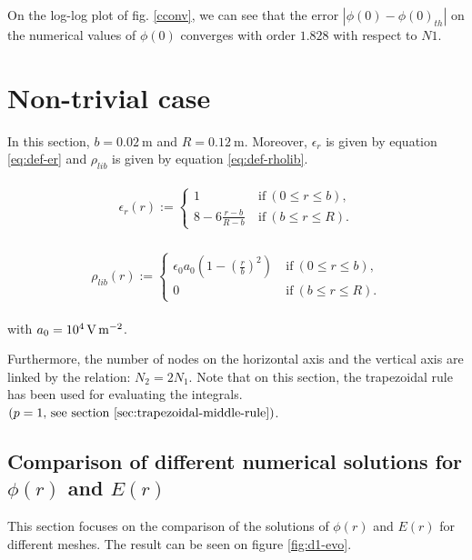 \documentclass[a4paper,12pt,twoside]{article}
\newcommand{\bracket}[1]{\left(#1\right)}
\begin{document}
  On the log-log plot of fig. \ref{cconv}, we can see that the error $|\phi(0)-\phi(0)_{th}|$ on the numerical values of $\phi(0)$ converges with order $1.828$ with respect to $N1$.

  \section{Non-trivial case}
  In this section, $b=\SI{0.02}{\m}$ and $R=\SI{0.12}{\m}$. Moreover, $\epsilon_r$ is given by equation \eqref{eq:def-er} and $\rho_{lib}$ is given by equation \eqref{eq:def-rholib}.

  \begin{align}
    \begin{split}
      \epsilon_r\bracket{r} := \begin{cases}
        1~&\text{if}~\bracket{0\leq r\leq b},\\
        8-6\frac{r-b}{R-b}~&\text{if}~\bracket{b\leq r\leq R}.
      \end{cases}
    \end{split}
    \label{eq:def-er}
  \end{align}

  \begin{align}
    \begin{split}
      \rho_{lib}\bracket{r} := \begin{cases}
        \epsilon_0 a_0\bracket{1-\bracket{\frac{r}{b}}^2}~&\text{if}~\bracket{0\leq r\leq b},\\
        0~&\text{if}~\bracket{b\leq r\leq R}.
      \end{cases}
    \end{split}
    \label{eq:def-rholib}
  \end{align}

  with $a_0=\SI{d4}{\volt\per\square\meter}$.

  Furthermore, the number of nodes on the horizontal axis and the vertical axis are linked by the relation: $N_2 = 2N_1$.
  Note that on this section, the trapezoidal rule has been used for evaluating the integrals. $\bracket{p=1\text{, see section \ref{sec:trapezoidal-middle-rule}}}$.


  \subsection{Comparison of different numerical solutions for $\phi\bracket{r}$ and $E\bracket{r}$}
  This section focuses on the comparison of the solutions of $\phi\bracket{r}$ and $E\bracket{r}$ for different meshes.
  The result can be seen on figure \ref{fig:d1-evo}.
\end{document}
